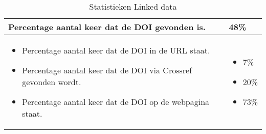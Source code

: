 \begin{table}[h!]
    \caption{Statistieken Linked data}
    \centering
    \begin{tabularx}{\textwidth}{|X|p{4cm}|} 
        \hline
        Percentage aantal keer dat de DOI gevonden is.&48\%\\
        \hline
        \begin{itemize}
            \item Percentage aantal keer dat de DOI in de URL staat.
            \item Percentage aantal keer dat de DOI via Crossref gevonden wordt.
            \item Percentage aantal keer dat de DOI op de webpagina staat.
        \end{itemize}
        &
        \begin{itemize}
            \item 7\%
            \item 20\%
            \item 73\%
        \end{itemize}
        \\
        \hline
    \end{tabularx}
    \label{table:statistieken_linked_data}
\end{table}
